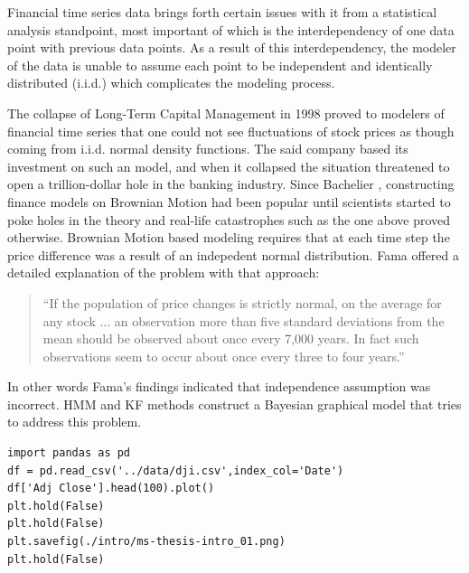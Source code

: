 Financial time series data brings forth certain issues with it from a
statistical analysis standpoint, most important of which is the interdependency
of one data point with previous data points. As a result of this
interdependency, the modeler of the data is unable to assume each point to be
independent and identically distributed (i.i.d.) which complicates the modeling
process.

The collapse of Long-Term Capital Management in 1998 proved to modelers of
financial time series that one could not see fluctuations of stock prices as
though coming from i.i.d. normal density functions. The said company based its
investment on such an model, and when it collapsed the situation threatened to
open a trillion-dollar hole in the banking industry. Since Bachelier
\cite{bachelier}, constructing finance models on Brownian Motion had been
popular until scientists started to poke holes in the theory and real-life
catastrophes such as the one above proved otherwise. Brownian Motion based
modeling requires that at each time step the price difference was a result of an
indepedent normal distribution. Fama \cite{fama} offered a detailed explanation
of the problem with that approach:

\begin{quote}
``If the population of price changes is strictly normal, on the average for any
stock ... an observation more than five standard deviations from the mean
should be observed about once every 7,000 years. In fact such observations
seem to occur about once every three to four years.''
\end{quote}

In other words Fama's findings indicated that independence assumption was
incorrect. HMM and KF methods construct a Bayesian graphical model that tries to
address this problem.

\begin{verbatim}
import pandas as pd
df = pd.read_csv('../data/dji.csv',index_col='Date')
df['Adj Close'].head(100).plot()
plt.hold(False)
plt.hold(False)
plt.savefig(./intro/ms-thesis-intro_01.png)
plt.hold(False)
\end{verbatim}


